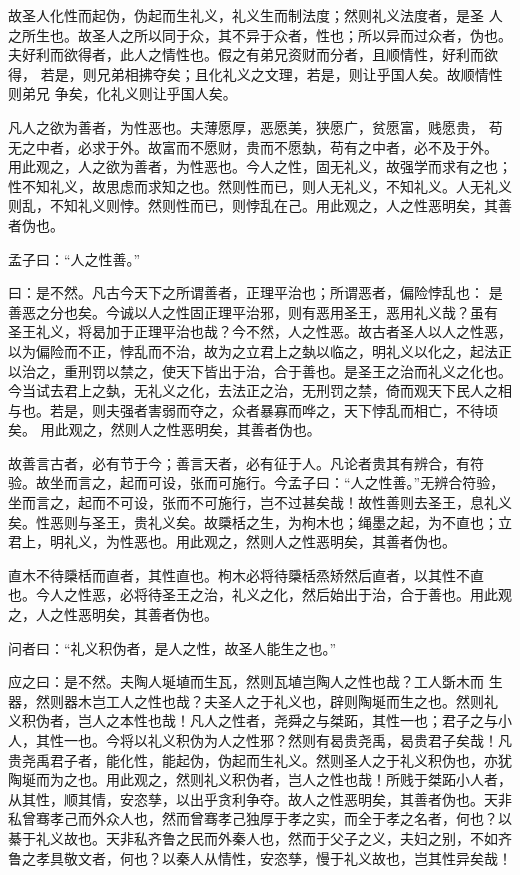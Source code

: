 \documentclass[]{article}
\begin{document}
故圣人化性而起伪，伪起而生礼义，礼义生而制法度；然则礼义法度者，是圣
人之所生也。故圣人之所以同于众，其不异于众者，性也；所以异而过众者，伪也。
夫好利而欲得者，此人之情性也。假之有弟兄资财而分者，且顺情性，好利而欲得，
若是，则兄弟相拂夺矣；且化礼义之文理，若是，则让乎国人矣。故顺情性则弟兄
争矣，化礼义则让乎国人矣。

凡人之欲为善者，为性恶也。夫薄愿厚，恶愿美，狭愿广，贫愿富，贱愿贵，
苟无之中者，必求于外。故富而不愿财，贵而不愿埶，苟有之中者，必不及于外。
用此观之，人之欲为善者，为性恶也。今人之性，固无礼义，故强学而求有之也；
性不知礼义，故思虑而求知之也。然则性而已，则人无礼义，不知礼义。人无礼义
则乱，不知礼义则悖。然则性而已，则悖乱在己。用此观之，人之性恶明矣，其善
者伪也。

孟子曰：``人之性善。''

曰：是不然。凡古今天下之所谓善者，正理平治也；所谓恶者，偏险悖乱也：
是善恶之分也矣。今诚以人之性固正理平治邪，则有恶用圣王，恶用礼义哉？虽有
圣王礼义，将曷加于正理平治也哉？今不然，人之性恶。故古者圣人以人之性恶，
以为偏险而不正，悖乱而不治，故为之立君上之埶以临之，明礼义以化之，起法正
以治之，重刑罚以禁之，使天下皆出于治，合于善也。是圣王之治而礼义之化也。
今当试去君上之埶，无礼义之化，去法正之治，无刑罚之禁，倚而观天下民人之相
与也。若是，则夫强者害弱而夺之，众者暴寡而哗之，天下悖乱而相亡，不待顷矣。
用此观之，然则人之性恶明矣，其善者伪也。

故善言古者，必有节于今；善言天者，必有征于人。凡论者贵其有辨合，有符
验。故坐而言之，起而可设，张而可施行。今孟子曰：``人之性善。''无辨合符验，
坐而言之，起而不可设，张而不可施行，岂不过甚矣哉！故性善则去圣王，息礼义
矣。性恶则与圣王，贵礼义矣。故檃栝之生，为枸木也；绳墨之起，为不直也；立
君上，明礼义，为性恶也。用此观之，然则人之性恶明矣，其善者伪也。

直木不待檃栝而直者，其性直也。枸木必将待檃栝烝矫然后直者，以其性不直
也。今人之性恶，必将待圣王之治，礼义之化，然后始出于治，合于善也。用此观
之，人之性恶明矣，其善者伪也。

问者曰：``礼义积伪者，是人之性，故圣人能生之也。''

应之曰：是不然。夫陶人埏埴而生瓦，然则瓦埴岂陶人之性也哉？工人斲木而
生器，然则器木岂工人之性也哉？夫圣人之于礼义也，辟则陶埏而生之也。然则礼
义积伪者，岂人之本性也哉！凡人之性者，尧舜之与桀跖，其性一也；君子之与小
人，其性一也。今将以礼义积伪为人之性邪？然则有曷贵尧禹，曷贵君子矣哉！凡
贵尧禹君子者，能化性，能起伪，伪起而生礼义。然则圣人之于礼义积伪也，亦犹
陶埏而为之也。用此观之，然则礼义积伪者，岂人之性也哉！所贱于桀跖小人者，
从其性，顺其情，安恣孳，以出乎贪利争夺。故人之性恶明矣，其善者伪也。天非
私曾骞孝己而外众人也，然而曾骞孝己独厚于孝之实，而全于孝之名者，何也？以
綦于礼义故也。天非私齐鲁之民而外秦人也，然而于父子之义，夫妇之别，不如齐
鲁之孝具敬文者，何也？以秦人从情性，安恣孳，慢于礼义故也，岂其性异矣哉！
\end{document}

